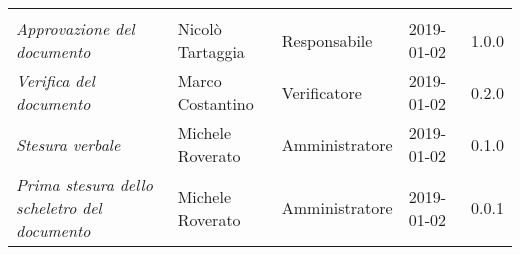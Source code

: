 \newpage 
\section*{}
\begin{table}[H]
	\centering
	\begin{tabular}{p{4cm}|C{3cm}|C{3cm}|R{2.5cm}|R{2cm}}
		
		 & & & & \\
		
		
		\emph{Approvazione del documento} &  Nicolò Tartaggia & Responsabile & 2019-01-02 & 1.0.0 \\
		\hline
		
		\emph{Verifica del documento} & Marco Costantino & Verificatore & 2019-01-02 & 0.2.0 \\
		\hline

		\emph{Stesura verbale} & Michele Roverato & Amministratore & 2019-01-02 & 0.1.0 \\
		\hline
		
		\emph{Prima stesura dello scheletro del documento} & Michele Roverato & Amministratore & 2019-01-02 & 0.0.1 \\
		
	\end{tabular}
	
\end{table}


\clearpage
